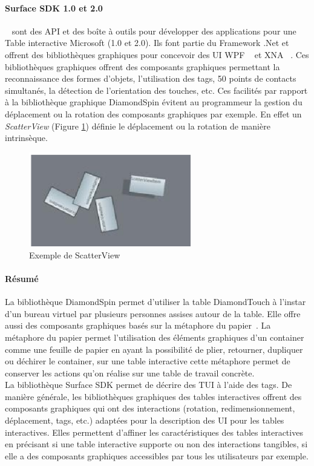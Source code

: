 \paragraph{Surface SDK  1.0 et 2.0}\label{sec:chap2:2:2:2} ~\cite{Microsoft2012} sont des API et des boîte à outils pour développer des applications pour une Table interactive Microsoft (1.0 et 2.0). Ils font partie du Framework .Net et offrent des bibliothèques graphiques pour concevoir des UI WPF ~\cite{MicrosoftWPF2012} et XNA ~\cite{MicrosoftXNA2012}. Ces bibliothèques graphiques offrent des composants graphiques permettant la reconnaissance des formes d'objets, l'utilisation des tags, 50 points de contacts simultanés, la détection de l'orientation des touches, etc. Ces facilités par rapport à la bibliothèque graphique DiamondSpin évitent au programmeur la gestion du déplacement ou la rotation des composants graphiques par exemple. En effet un \textit{ScatterView} (Figure \ref{fig:chap2:3}) définie le déplacement ou la rotation de manière intrinsèque.
\begin{figure}[ht]
\begin{center}
\includegraphics[width=200pt]{chap2/img-4}
\caption{Exemple de ScatterView}
\label{fig:chap2:3}
\end{center}
\end{figure}
\paragraph{Résumé}
\label{sec:chap2:2:2:3}
La bibliothèque DiamondSpin permet d'utiliser la table DiamondTouch à l'instar d'un bureau virtuel par plusieurs personnes assises autour de la table. Elle offre aussi des composants graphiques basés sur la métaphore du papier~\cite{Besacier2007}. La métaphore du papier permet l'utilisation des éléments graphiques d'un container comme une feuille de papier en ayant la possibilité de plier, retourner, dupliquer ou déchirer le container, sur une table interactive cette métaphore permet de conserver les actions qu'on réalise sur une table de travail concrète.\\ 
La bibliothèque Surface SDK permet de décrire des TUI à l'aide des tags. De manière générale, les bibliothèques graphiques des tables interactives offrent des composants graphiques qui ont des interactions (rotation, redimensionnement, déplacement, tags, etc.) adaptées pour la description des UI pour les tables interactives. Elles permettent d'affiner les caractéristiques des tables interactives en précisant si une table interactive supporte ou non des interactions tangibles, si elle a des composants graphiques accessibles par tous les utilisateurs par exemple.\\

